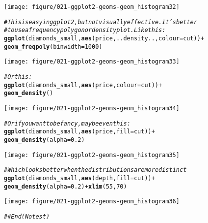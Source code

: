 \documentclass[a4paper,titlepage]{tufte-handout}\usepackage[]{graphicx}\usepackage[]{color}
\makeatletter
\def\maxwidth{ %
  \ifdim\Gin@nat@width>\linewidth
    \linewidth
  \else
    \Gin@nat@width
  \fi
}
\newcommand{\hlnum}[1]{\textcolor[rgb]{0.686,0.059,0.569}{#1}}%
\newcommand{\hlcom}[1]{\textcolor[rgb]{0.678,0.584,0.686}{\textit{#1}}}%
\newcommand{\hlopt}[1]{\textcolor[rgb]{0,0,0}{#1}}%
\newcommand{\hlstd}[1]{\textcolor[rgb]{0.345,0.345,0.345}{#1}}%
\newcommand{\hlkwc}[1]{\textcolor[rgb]{0.333,0.667,0.333}{#1}}%
\newcommand{\hlkwd}[1]{\textcolor[rgb]{0.737,0.353,0.396}{\textbf{#1}}}%
\newenvironment{kframe}{%
 \def\at@end@of@kframe{}%
 \ifinner\ifhmode%
  \def\at@end@of@kframe{\end{minipage}}%
  \begin{minipage}{\columnwidth}%
 \fi\fi%
 \def\FrameCommand##1{\hskip\@totalleftmargin \hskip-\fboxsep
 \colorbox{shadecolor}{##1}\hskip-\fboxsep
     \hskip-\linewidth \hskip-\@totalleftmargin \hskip\columnwidth}%
 \MakeFramed {\advance\hsize-\width
   \@totalleftmargin\z@ \linewidth\hsize
   \@setminipage}}%
 {\par\unskip\endMakeFramed%
 \at@end@of@kframe}
\newenvironment{knitrout}{}{} %
\makeatother
\begin{document}
\begin{knitrout}
\begin{kframe}
{\ttfamily\noindent\itshape\color{messagecolor}{\#\# stat\_bin: binwidth defaulted to range/30. Use 'binwidth = x' to adjust this.}}\end{kframe}
\texttt{[image: figure/021-ggplot2-geoms-geom\_histogram32]} 
\begin{kframe}\begin{alltt}
\hlcom{# This is easy in ggplot2, but not visually effective.  It's better}
\hlcom{# to use a frequency polygon or density plot.  Like this:}
\hlkwd{ggplot}\hlstd{(diamonds_small,} \hlkwd{aes}\hlstd{(price, ..density..,} \hlkwc{colour} \hlstd{= cut))} \hlopt{+}
  \hlkwd{geom_freqpoly}\hlstd{(}\hlkwc{binwidth} \hlstd{=} \hlnum{1000}\hlstd{)}
\end{alltt}
\end{kframe}
\texttt{[image: figure/021-ggplot2-geoms-geom\_histogram33]} 
\begin{kframe}\begin{alltt}
\hlcom{# Or this:}
\hlkwd{ggplot}\hlstd{(diamonds_small,} \hlkwd{aes}\hlstd{(price,} \hlkwc{colour} \hlstd{= cut))} \hlopt{+}
  \hlkwd{geom_density}\hlstd{()}
\end{alltt}
\end{kframe}
\texttt{[image: figure/021-ggplot2-geoms-geom\_histogram34]} 
\begin{kframe}\begin{alltt}
\hlcom{# Or if you want to be fancy, maybe even this:}
\hlkwd{ggplot}\hlstd{(diamonds_small,} \hlkwd{aes}\hlstd{(price,} \hlkwc{fill} \hlstd{= cut))} \hlopt{+}
  \hlkwd{geom_density}\hlstd{(}\hlkwc{alpha} \hlstd{=} \hlnum{0.2}\hlstd{)}
\end{alltt}
\end{kframe}
\texttt{[image: figure/021-ggplot2-geoms-geom\_histogram35]} 
\begin{kframe}\begin{alltt}
\hlcom{# Which looks better when the distributions are more distinct}
\hlkwd{ggplot}\hlstd{(diamonds_small,} \hlkwd{aes}\hlstd{(depth,} \hlkwc{fill} \hlstd{= cut))} \hlopt{+}
  \hlkwd{geom_density}\hlstd{(}\hlkwc{alpha} \hlstd{=} \hlnum{0.2}\hlstd{)} \hlopt{+} \hlkwd{xlim}\hlstd{(}\hlnum{55}\hlstd{,} \hlnum{70}\hlstd{)}
\end{alltt}


{\ttfamily\noindent\color{warningcolor}{\#\# Warning: Removed 2 rows containing non-finite values (stat\_density).}}\end{kframe}
\texttt{[image: figure/021-ggplot2-geoms-geom\_histogram36]} 
\begin{kframe}\begin{alltt}
\hlcom{## End(No test)}
\end{alltt}
\end{kframe}
\end{knitrout}
\end{document}
